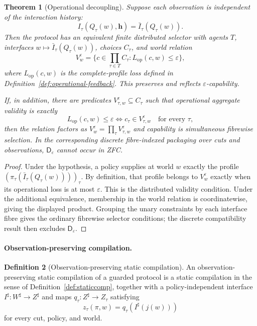 \documentclass[11pt]{article}
\theoremstyle{plain}
\newtheorem{theorem}{Theorem}[section]
\theoremstyle{definition}
\newtheorem{definition}[theorem]{Definition}
\theoremstyle{remark}
\newcommand{\eps}{\varepsilon}
\begin{document}
\begin{theorem}[Operational decoupling]
\label{thm:operational-decoupling}
Suppose each observation is independent of the interaction history:
\[
I_\tau(Q_\tau(w),\mathbf h)=\bar I_\tau(Q_\tau(w)).
\]
Then the protocol has an equivalent finite distributed selector with agents
$T$, interfaces $w\mapsto\bar I_\tau(Q_\tau(w))$, choices $C_\tau$, and
world relation
\[
V_w^\eps=
\{c\in\prod_{\tau\in T}C_\tau:
L_{\mathrm{op}}(c,w)\le\eps\},
\]
where $L_{\mathrm{op}}(c,w)$ is the complete-profile loss defined in
Definition~\ref{def:operational-feedback}. This preserves and reflects
$\eps$-capability.

If, in addition, there are predicates
$V_{\tau,w}^\eps\subseteq C_\tau$ such that operational aggregate validity is
exactly
\[
L_{\mathrm{op}}(c,w)\le\eps
\iff
c_\tau\in V_{\tau,w}^\eps\quad\text{for every }\tau,
\]
then the relation factors as $V_w^\eps=\prod_\tau V_{\tau,w}^\eps$ and
capability is simultaneous fibrewise selection. In the corresponding discrete fibre-indexed packaging over cuts and
observations, $\mathsf D_\eps$ cannot occur in ZFC.
\end{theorem}

\begin{proof}
Under the hypothesis, a policy supplies at world $w$ exactly the profile
$(\pi_\tau(\bar I_\tau(Q_\tau(w))))_\tau$. By definition, that profile belongs
to $V_w^\eps$ exactly when its operational loss is at most $\eps$. This is the
distributed validity condition. Under the additional equivalence, membership in
the world relation is coordinatewise, giving the displayed product. Grouping
the unary constraints by each interface fibre gives the ordinary fibrewise
selector conditions; the discrete compatibility result then excludes
$\mathsf D_\eps$.
\end{proof}

\paragraph{Observation-preserving compilation.}

\begin{definition}[Observation-preserving static compilation]
\label{def:observation-compilation}
An observation-preserving static compilation of a guarded protocol is a static
compilation in the sense of Definition~\ref{def:staticcomp}, together with a
policy-independent interface $I^\sharp:W^\sharp\to Z^\sharp$ and maps
$q_\tau:Z^\sharp\to Z_\tau$ satisfying
\[
z_\tau(\pi,w)=q_\tau(I^\sharp(j(w)))
\]
for every cut, policy, and world.
\end{definition}
\end{document}
